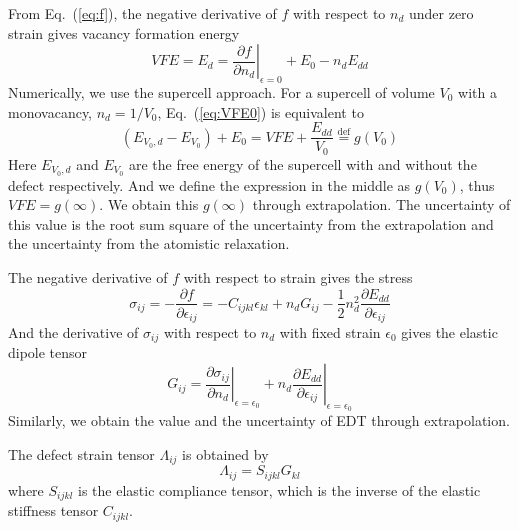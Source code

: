 \documentclass[%
 reprint,
 nofootinbib,
 amsmath,amssymb,
 aps,
]{revtex4-1}
\begin{document}
From Eq.~(\ref{eq:f}), the negative derivative of $f$ with respect to $n_d$ under zero strain gives vacancy formation energy
\begin{equation}
  \label{eq:VFE0}
  \mathit{VFE} = E_d = \left.\frac{\partial f}{\partial n_d}\right|_{\epsilon = 0} + E_{0} - n_d E_{dd}
\end{equation}
Numerically, we use the supercell approach.
For a supercell of volume $V_0$ with a monovacancy, $n_d=1/V_0$, Eq.~(\ref{eq:VFE0}) is equivalent to
\begin{equation}
  (E_{V_0, d} - E_{V_0}) + E_{0} = \mathit{VFE} + \frac{E_{dd}}{V_0} \stackrel{\mathrm{def}}{=} \mathit{g}(V_0)
\end{equation}
Here $E_{V_0, d}$ and $E_{V_0}$ are the free energy of the supercell with and without the defect respectively.
And we define the expression in the middle as $g(V_0)$, thus $\mathit{VFE} = g(\infty)$.
We obtain this $g(\infty)$ through extrapolation.
The uncertainty of this value is the root sum square of the uncertainty from the extrapolation and the uncertainty from the atomistic relaxation.


The negative derivative of $f$ with respect to strain gives the stress
\begin{equation}
  \label{eq:stress}
  \sigma_{ij} = -\frac{\partial f}{\partial \epsilon_{ij}}
  = -C_{ijkl}\epsilon_{kl} + n_dG_{ij} - \frac{1}{2}n_d^2\frac{\partial E_{dd}}{\partial \epsilon_{ij}}
\end{equation}
And the derivative of $\sigma_{ij}$ with respect to $n_d$ with fixed strain $\epsilon_0$ gives the elastic dipole tensor
\begin{equation}
  \label{eq:EDT}
  G_{ij} = \left.\frac{\partial \sigma_{ij}}{\partial n_d}\right|_{\epsilon = \epsilon_0}
  + n_d \left.\frac{\partial E_{dd}}{\partial \epsilon_{ij}}\right|_{\epsilon = \epsilon_0}
\end{equation}
Similarly, we obtain the value and the uncertainty of EDT through extrapolation.

The defect strain tensor $\Lambda_{ij}$ is obtained by
\begin{equation}
  \label{eq:DST}
  \Lambda_{ij} = S_{ijkl} G_{kl}
\end{equation}
where $S_{ijkl}$ is the elastic compliance tensor, which is the inverse of the elastic stiffness tensor $C_{ijkl}$.
\end{document}
